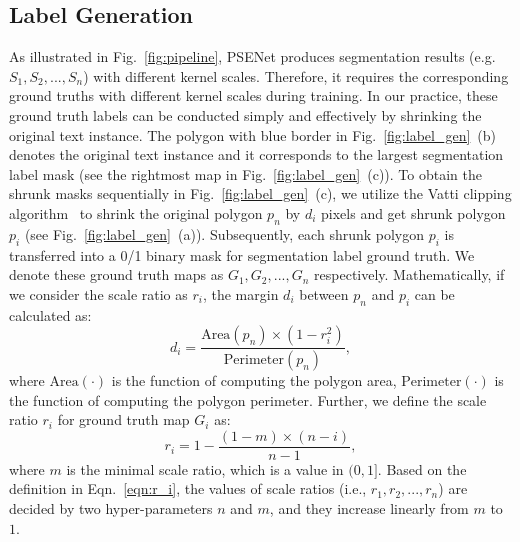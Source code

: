 \documentclass[10pt,twocolumn,letterpaper]{article}
\begin{document}
	\subsection{Label Generation}
	\label{sec:label-gen}
	As illustrated in Fig.~\ref{fig:pipeline}, PSENet produces segmentation results (e.g. $S_1, S_2, ..., S_n$) with different kernel scales. Therefore, it requires the corresponding ground truths with different kernel scales during training. In our practice, these ground truth labels can be conducted simply and effectively by shrinking the original text instance.
	The polygon with blue border in Fig.~\ref{fig:label_gen}~(b) denotes the original text instance %
	and it corresponds to the largest segmentation label mask (see the rightmost map in Fig.~\ref{fig:label_gen}~(c)). To obtain the shrunk masks sequentially in Fig.~\ref{fig:label_gen}~(c), we utilize the Vatti clipping algorithm~\cite{vatti1992generic} to shrink the original polygon $p_n$ by $d_i$ pixels and get shrunk polygon $p_i$ (see Fig.~\ref{fig:label_gen}~(a)). Subsequently, each shrunk polygon $p_i$ is transferred into a 0/1 binary mask for segmentation label ground truth. We denote these ground truth maps as $G_1, G_2, ..., G_n$ respectively. Mathematically, if we consider the scale ratio as $r_i$, the margin $d_i$ between $p_n$ and $p_i$ can be calculated as:
	\begin{equation}
	d_i = \frac{\mbox{Area}(p_n) \times (1 - r_i^2)}{\mbox{Perimeter}(p_n)},
	\label{eqn:d_i}
	\end{equation}
	where $\mbox{Area}(\cdot)$ is the function of computing the polygon area, $\mbox{Perimeter}(\cdot)$ is the function of computing the polygon perimeter. Further, we define the scale ratio $r_i$ for ground truth map $G_i$ as:
	\begin{equation}
	r_i = 1 - \frac{(1 - m) \times (n - i)}{n - 1},
	\label{eqn:r_i}
	\end{equation}
	where $m$ is the minimal scale ratio, which is a value in $(0, 1]$. Based on the definition in Eqn.~\eqref{eqn:r_i}, the values of scale ratios (i.e., $r_1, r_2, ..., r_n$) are decided by two hyper-parameters $n$ and $m$, and they increase linearly from $m$ to $1$.
	
\end{document}

